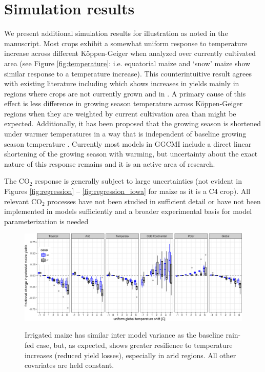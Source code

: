 \documentclass[10pt]{article}
\begin{document}
{\clearpage
\section{Simulation results}
We present additional simulation results for illustration as noted in the manuscript. Most crops exhibit a somewhat uniform response to temperature increase across different K\"{o}ppen-Geiger when analyzed over currently cultivated area (see Figure \ref{fig:temperature}: i.e. equatorial maize and `snow' maize show similar response to a temperature increase). This counterintuitive result agrees with existing literature including \citet{Rosenzweig2014} which shows increases in yields mainly in regions where crops are not currently grown and in \citet{Bassu2014}. A primary cause of this effect is less difference in growing season temperature across K\"{o}ppen-Geiger regions when they are weighted by current cultivation area than might be expected. Additionally, it has been proposed that the growing season is shortened under warmer temperatures in a way that is independent of baseline growing season temperature \citep[e.g.][]{Wang2017, Rezaei2018}. Currently most models in GGCMI include a direct linear shortening of the growing season with warming, but uncertainty about the exact nature of this response remains and it is an active area of research.

The CO$_2$ response is generally subject to large uncertainties (not evident in Figures \ref{fig:regression} -- \ref{fig:regression_iowa} for maize as it is a C4 crop). All relevant CO$_2$ processes have not been studied in sufficient detail or have not been implemented in models sufficiently \citep[e.g.][]{Boote13} and a broader experimental basis for model parameterization is needed \citep{leaky09}

\begin{figure}[h!]
\includegraphics[width=\textwidth]{s_sim_KG_irr_all.png}\\
\caption{Irrigated maize has similar inter model variance as the baseline rain-fed case, but, as expected, shows greater resilience to temperature increases (reduced yield losses), especially in arid regions. All other covariates are held constant.}
\label{fig:KGirr_all}
\end{figure}

}
\end{document}
